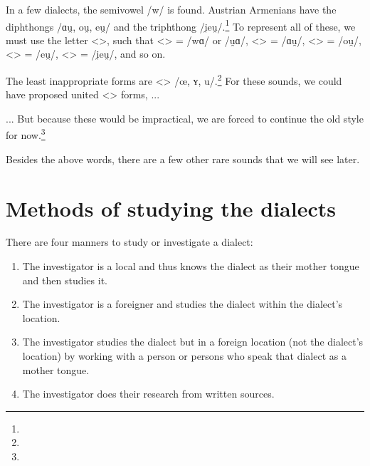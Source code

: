 In a few dialects, the semivowel /w/ is found. Austrian Armenians have the diphthongs /ɑu̯, ou̯, eu̯/ and the triphthong /i̯eu̯/.\footnote{} To represent all of these, we must use the letter <>, such that <> = /wɑ/ or /u̯ɑ/, <> = /ɑu̯/, <> = /ou̯/, <> = /eu̯/, <> = /i̯eu̯/, and so on. 

The least inappropriate forms are <> /œ, ʏ, u/.\footnote{} For these sounds, we could have proposed united <> forms, ... 


\begin{adjarianpage}\label{page:11}\end{adjarianpage}%

... But because these would be impractical, we are forced to continue the old style for now.\footnote{} 

Besides the above words, there are a few other rare sounds that we will see later. 

\section{Methods of studying the dialects}

There are four manners to study or investigate a dialect:
\begin{enumerate}
	\item The investigator is a local and thus knows the dialect as their mother tongue and then studies it. 
	\item The investigator is a foreigner and studies the dialect within the dialect's location. 
	\item The investigator studies the dialect but in a foreign location (not the dialect's location) by working with a person or persons who speak that dialect as a mother tongue. 
	\item The investigator does their research from written sources. 
	
\end{enumerate}

